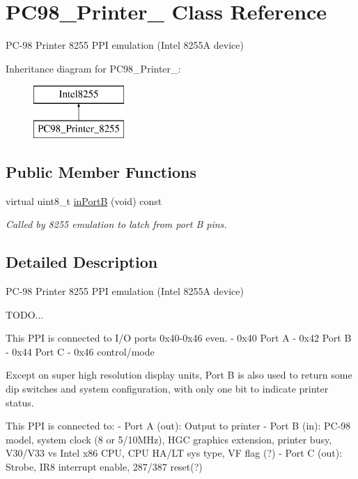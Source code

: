 \hypertarget{classPC98__Printer__8255}{\section{P\-C98\-\_\-\-Printer\-\_ Class Reference}
\label{classPC98__Printer__8255}
}


P\-C-\/98 Printer 8255 P\-P\-I emulation (Intel 8255\-A device)  


Inheritance diagram for P\-C98\-\_\-\-Printer\-\_\-:\begin{figure}[H]
\begin{center}
\leavevmode
\includegraphics[height=2.000000cm]{classPC98__Printer__8255}
\end{center}
\end{figure}
\subsection*{Public Member Functions}
\begin{DoxyCompactItemize}
\item 
\hypertarget{classPC98__Printer__8255_a0c5fd663ef9c3b1392da2255aa0ba888}{virtual uint8\-\_\-t \hyperlink{classPC98__Printer__8255_a0c5fd663ef9c3b1392da2255aa0ba888}{in\-Port\-B} (void) const }\label{classPC98__Printer__8255_a0c5fd663ef9c3b1392da2255aa0ba888}

\begin{DoxyCompactList}\small\item\em Called by 8255 emulation to latch from port B pins. \end{DoxyCompactList}\end{DoxyCompactItemize}


\subsection{Detailed Description}
P\-C-\/98 Printer 8255 P\-P\-I emulation (Intel 8255\-A device) 

T\-O\-D\-O... \begin{DoxyVerb}         This PPI is connected to I/O ports 0x40-0x46 even.
         - 0x40 Port A
         - 0x42 Port B
         - 0x44 Port C
         - 0x46 control/mode

         Except on super high resolution
         display units, Port B is also used to
         return some dip switches and system configuration,
         with only one bit to indicate printer status.

         This PPI is connected to:
         - Port A (out): Output to printer
         - Port B (in):  PC-98 model, system clock (8 or 5/10MHz),
                         HGC graphics extension, printer busy,
                         V30/V33 vs Intel x86 CPU, CPU HA/LT sys type,
                         VF flag (?)
         - Port C (out): Strobe, IR8 interrupt enable, 287/387 reset(?)  \end{DoxyVerb}
 

